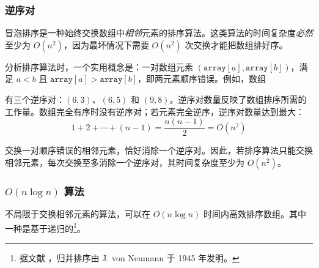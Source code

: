 \begin{center}
\end{center}

\subsubsection{逆序对}


冒泡排序是一种始终交换数组中\emph{相邻}元素的排序算法。这类算法的时间复杂度\emph{必然}至少为 $O(n^2)$，因为最坏情况下需要 $O(n^2)$ 次交换才能把数组排好序。

分析排序算法时，一个实用概念是：一对数组元素 $(\texttt{array}[a],\texttt{array}[b])$，满足 $a<b$ 且 $\texttt{array}[a]>\texttt{array}[b]$，即两元素顺序错误。例如，数组
\begin{center}
\end{center}
有三个逆序对：$(6,3)$、$(6,5)$ 和 $(9,8)$。逆序对数量反映了数组排序所需的工作量。数组完全有序时没有逆序对；若元素完全逆序，逆序对数量达到最大：
\[1+2+\cdots+(n-1)=\frac{n(n-1)}{2} = O(n^2)\]

交换一对顺序错误的相邻元素，恰好消除一个逆序对。因此，若排序算法只能交换相邻元素，每次交换至多消除一个逆序对，其时间复杂度至少为 $O(n^2)$。

\subsubsection{$O(n \log n)$ 算法}


不局限于交换相邻元素的算法，可以在 $O(n \log n)$ 时间内高效排序数组。其中一种是基于递归的\footnote{据文献 \cite{knu983}，归并排序由 J. von Neumann 于 1945 年发明。}。

